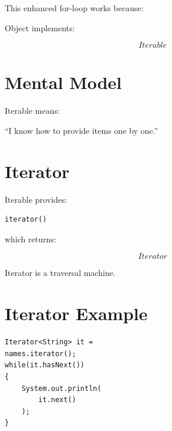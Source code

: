 \documentclass[11pt,a4paper]{book}
\begin{document}
This enhanced for-loop works because:


Object implements:

\[
Iterable
\]


\section{Mental Model}

\begin{mentalmodel}

Iterable means:


``I know how to provide items
one by one.''

\end{mentalmodel}


\section{Iterator}

Iterable provides:

\begin{verbatim} 
iterator()
\end{verbatim}


which returns:

\[
Iterator
\]


Iterator is a traversal machine.


\section{Iterator Example}

\begin{verbatim} 
Iterator<String> it =
names.iterator();
while(it.hasNext())
{
    System.out.println(
        it.next()
    );
}
\end{verbatim}

\end{document}
